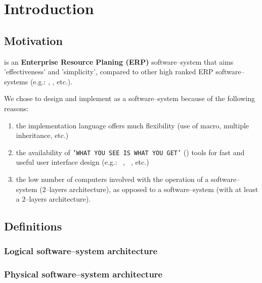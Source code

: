 \chapter{Introduction}

\section{Motivation}

\yerotherpblack is an \textbf{Enterprise Resource Planing (ERP)}
software--system that aims 'effectiveness' and 'simplicity',
compared to other high ranked ERP software--systems
(e.g.: \sageerp, \saperp, etc.).

We chose to design and implement \yerotherpblack as
a \thickclient software--system because of the
following reasons:

\begin{enumerate}[1)]

	\item the implementation language \cplusplus
		offers much flexibility (use of macro, 
		multiple inheritance, etc.)
		
	\item the availability of \texttt{'WHAT YOU SEE IS WHAT YOU GET'}
		(\wy) tools for fast and useful
		user interface design (e.g.: \qtdesigner~\cite{qtdesigner:2020},
		\ministudio~\cite{miniStudio:2020}, etc.)
		
	\item the low number of computers involved
		with the operation of a \thickclient
		software--system ($2$--layers architecture),
		as opposed to a \webbrowserbased software--system
		(with at least a $2$--layers architecture).
	
\end{enumerate}

\section{Definitions}

\subsection{Logical software--system architecture}

\subsection{Physical software--system architecture}